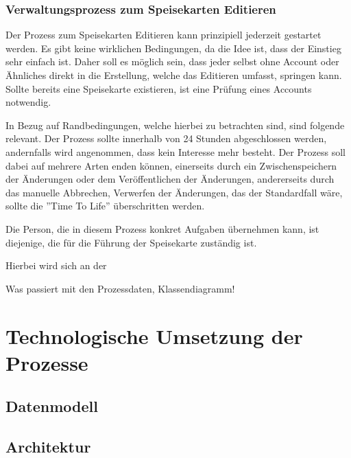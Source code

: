 \subsubsection{Verwaltungsprozess zum Speisekarten Editieren}
Der Prozess zum Speisekarten Editieren kann prinzipiell jederzeit gestartet werden. Es gibt keine wirklichen Bedingungen, da die Idee ist, dass der Einstieg sehr einfach ist. Daher soll es möglich sein, dass jeder selbst ohne Account oder Ähnliches direkt in die Erstellung, welche das Editieren umfasst, springen kann. Sollte bereits eine Speisekarte existieren, ist eine Prüfung eines Accounts notwendig.

In Bezug auf Randbedingungen, welche hierbei zu betrachten sind, sind folgende relevant. Der Prozess sollte innerhalb von 24 Stunden abgeschlossen werden, andernfalls wird angenommen, dass kein Interesse mehr besteht. Der Prozess soll dabei auf mehrere Arten enden können, einerseits durch ein Zwischenspeichern der Änderungen oder dem Veröffentlichen der Änderungen, andererseits durch das manuelle Abbrechen, Verwerfen der Änderungen, das der Standardfall wäre, sollte die ''Time To Life'' überschritten werden.

Die Person, die in diesem Prozess konkret Aufgaben übernehmen kann, ist diejenige, die für die Führung der Speisekarte zuständig ist.

\clearpage
{}

Hierbei wird sich an der 


Was passiert mit den Prozessdaten,  Klassendiagramm!

\section{Technologische Umsetzung der Prozesse}
\label{sec:technologie_prozesse}
\subsection{Datenmodell}
\label{sec:datenmodell}

\subsection{Architektur}

